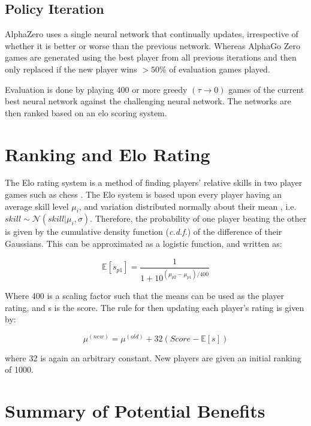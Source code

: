 \documentclass[../main.tex]{subfiles}
\begin{document}
\subsection{Policy Iteration}

AlphaZero uses a single neural network that continually updates, irrespective of whether it is better or worse than the previous network. Whereas AlphaGo Zero games are generated using the best player from all previous iterations and then only replaced if the new player wins $> 50\%$ of evaluation games played.

Evaluation is done by playing 400 or more greedy $(\tau \rightarrow 0)$ games of the current best neural network against the challenging neural network. The networks are then ranked based on an elo scoring system.

\section{Ranking and Elo Rating}

The Elo rating system is a method of finding players' relative skills in two player games such as chess \cite{elo}. The Elo system is based upon every player having an average skill level $\mu_i$, and variation distributed normally about their mean , i.e. $skill \sim \mathcal{N}(skill | \mu_i, \sigma)$. Therefore, the probability of one player beating the other is given by the cumulative density function (\textit{c.d.f.}) of the difference of their Gaussians. This can be approximated as a logistic function, and written as:

\begin{equation}
   \label{equ:elo}
   \mathbb{E}[s_{p1}] = \frac{1}{1+10^{(\mu_{p2} - \mu_{p1})/400}}
\end{equation}

Where 400 is a scaling factor such that the means can be used as the player rating, and s is the score. The rule for then updating each player's rating is given by:

\begin{equation}
   \mu^{(new)} = \mu^{(old)} + 32(Score - \mathbb{E}[s])
\end{equation}

where 32 is again an arbitrary constant. New players are given an initial ranking of 1000.

\section{Summary of Potential Benefits}
\end{document}
